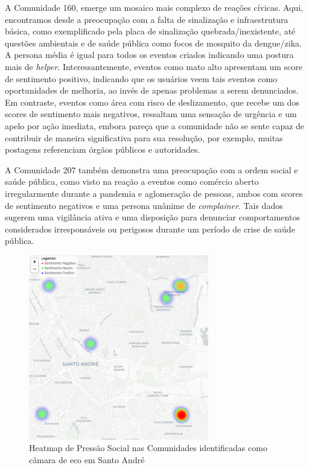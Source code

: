 A Comunidade 160, emerge um mosaico mais complexo de reações cívicas. Aqui, encontramos desde a preocupação com a falta de sinalização e infraestrutura básica, como exemplificado pela placa de sinalização quebrada/inexistente, até questões ambientais e de saúde pública como focos de mosquito da dengue/zika. A persona média é igual para todos os eventos criados indicando uma postura mais de \textit{helper}. Interessantemente, eventos como mato alto apresentam um score de sentimento positivo, indicando que os usuários veem tais eventos como oportunidades de melhoria, ao invés de apenas problemas a serem denunciados. Em contraste, eventos como área com risco de deslizamento, que recebe um dos scores de sentimento mais negativos, ressaltam uma sensação de urgência e um apelo por ação imediata, embora pareça que a comunidade não se sente capaz de contribuir de maneira significativa para sua resolução, por exemplo, muitas postagens referenciam órgãos públicos e autoridades.

A Comunidade 207 também demonstra uma preocupação com a ordem social e saúde pública, como visto na reação a eventos como comércio aberto irregularmente durante a pandemia e aglomeração de pessoas, ambos com scores de sentimento negativos e uma persona unânime de \textit{complainer}. Tais dados sugerem uma vigilância ativa e uma disposição para denunciar comportamentos considerados irresponsáveis ou perigosos durante um período de crise de saúde pública.

\begin{figure}[htb]
	\centering
	\includegraphics[width=0.7\textwidth]{images/echo_chamber_santo_andre_heatmap.PNG}
	\caption{Heatmap de Pressão Social nas Comunidades identificadas como câmara de eco em Santo André}
	\label{fig:echo_chamber_santo_andre_heatmap}
\end{figure}

